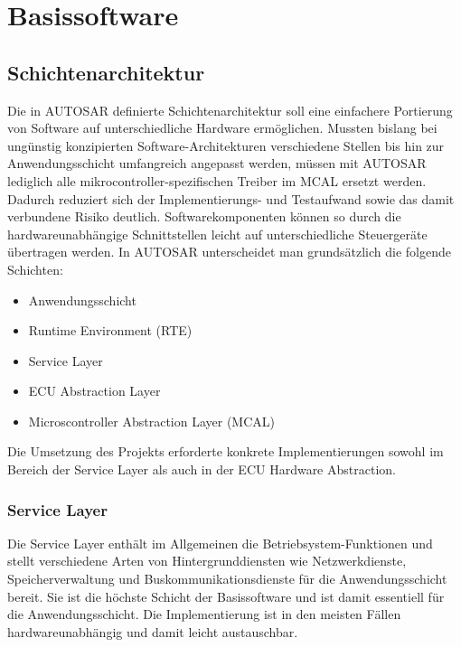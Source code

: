 \chapter{Basissoftware}


\section{Schichtenarchitektur}

Die in AUTOSAR definierte Schichtenarchitektur soll eine einfachere Portierung von Software auf unterschiedliche Hardware ermöglichen. Mussten bislang bei ungünstig konzipierten Software-Architekturen verschiedene Stellen bis hin zur Anwendungsschicht umfangreich angepasst werden, müssen mit AUTOSAR lediglich alle mikrocontroller-spezifischen Treiber im MCAL ersetzt werden. Dadurch reduziert sich der Implementierungs- und Testaufwand sowie das damit verbundene Risiko deutlich. Softwarekomponenten können so durch die hardwareunabhängige Schnittstellen leicht auf unterschiedliche Steuergeräte übertragen werden.
In AUTOSAR unterscheidet man grundsätzlich die folgende Schichten:

\begin{itemize}
\item Anwendungsschicht
\item Runtime Environment (RTE)
\item Service Layer
\item ECU Abstraction Layer
\item Microscontroller Abstraction Layer (MCAL)
\end{itemize}


Die Umsetzung des Projekts erforderte konkrete Implementierungen sowohl im Bereich der Service Layer als auch in der ECU Hardware Abstraction.


\subsection{Service Layer}

Die Service Layer enthält im Allgemeinen die Betriebsystem-Funktionen und stellt verschiedene Arten von Hintergrunddiensten wie Netzwerkdienste, Speicherverwaltung und Buskommunikationsdienste für die Anwendungsschicht bereit. Sie ist die höchste Schicht der Basissoftware und ist damit essentiell für die Anwendungsschicht. Die Implementierung ist in den meisten Fällen hardwareunabhängig und damit leicht austauschbar.




